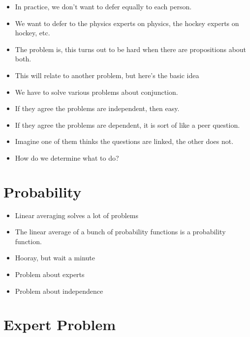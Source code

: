 \begin{itemize}
\item{} In practice, we don't want to defer equally to each person.

\item{} We want to defer to the physics experts on physics, the hockey experts on hockey, etc.

\item{} The problem is, this turns out to be hard when there are propositions about both.

\item{} This will relate to another problem, but here's the basic idea

\item{} We have to solve various problems about conjunction.

\item{} If they agree the problems are independent, then easy.

\item{} If they agree the problems are dependent, it is sort of like a peer question.

\item{} Imagine one of them thinks the questions are linked, the other does not.

\item{} How do we determine what to do?

\end{itemize}
\section{Probability}
\label{probability}

\begin{itemize}
\item{} Linear averaging solves a lot of problems

\item{} The linear average of a bunch of probability functions is a probability function.

\item{} Hooray, but wait a minute

\item{} Problem about experts

\item{} Problem about independence

\end{itemize}
\section{Expert Problem}
\label{expertproblem}

